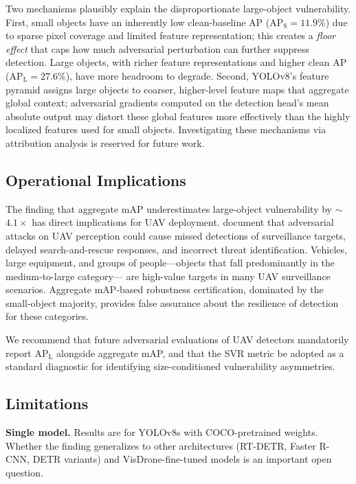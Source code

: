 \documentclass[journal]{IEEEtran}
\begin{document}
Two mechanisms plausibly explain the disproportionate
large-object vulnerability.
First, small objects have an inherently low clean-baseline AP
($\text{AP}_\text{S} = 11.9\%$) due to sparse pixel coverage
and limited feature representation; this creates a
\emph{floor effect} that caps how much adversarial perturbation
can further suppress detection.
Large objects, with richer feature representations and higher
clean AP ($\text{AP}_\text{L} = 27.6\%$), have more headroom
to degrade.
Second, YOLOv8's feature pyramid assigns large objects to
coarser, higher-level feature maps that aggregate global context;
adversarial gradients computed on the detection head's mean
absolute output may distort these global features more
effectively than the highly localized features used for small
objects.
Investigating these mechanisms via attribution analysis
is reserved for future work.

\subsection{Operational Implications}

The finding that aggregate mAP underestimates large-object
vulnerability by $\sim$$4.1\times$ has direct implications
for UAV deployment.
\citet{uavSecurity2025} document that adversarial attacks
on UAV perception could cause missed detections of
surveillance targets, delayed search-and-rescue responses,
and incorrect threat identification.
Vehicles, large equipment, and groups of people---objects
that fall predominantly in the medium-to-large category---
are high-value targets in many UAV surveillance scenarios.
Aggregate mAP-based robustness certification, dominated by
the small-object majority, provides false assurance about
the resilience of detection for these categories.

We recommend that future adversarial evaluations of
UAV detectors mandatorily report $\text{AP}_\text{L}$
alongside aggregate mAP, and that the SVR metric
be adopted as a standard diagnostic for identifying
size-conditioned vulnerability asymmetries.

\subsection{Limitations}

\textbf{Single model.}
Results are for YOLOv8s with COCO-pretrained weights.
Whether the finding generalizes to other architectures
(RT-DETR, Faster R-CNN, DETR variants) and
VisDrone-fine-tuned models is an important open question.
\end{document}
